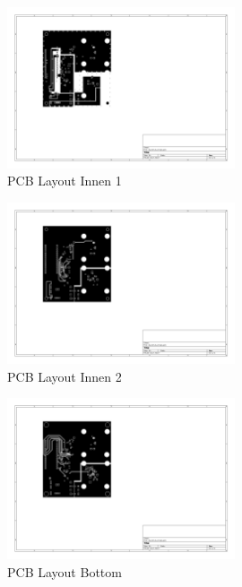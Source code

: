 \begin{figure}[H]
    \centering
    \includegraphics[trim=130 220 450 80, clip, width=0.6\textwidth]{attachments/pcb_In1_Cu.pdf}
    \caption{PCB Layout Innen 1}\label{fig:apdx_pcb_in1_cu}
\end{figure}

\begin{figure}[H]
    \centering
    \includegraphics[trim=130 220 450 80, clip, width=0.6\textwidth]{attachments/pcb_In2_Cu.pdf}
    \caption{PCB Layout Innen 2}\label{fig:apdx_pcb_in2_cu}
\end{figure}

\begin{figure}[H]
    \centering
    \includegraphics[trim=130 220 450 80, clip, width=0.6\textwidth]{attachments/pcb_B_Cu.pdf}
    \caption{PCB Layout Bottom}\label{fig:apdx_pcb_b_cu}
\end{figure}

